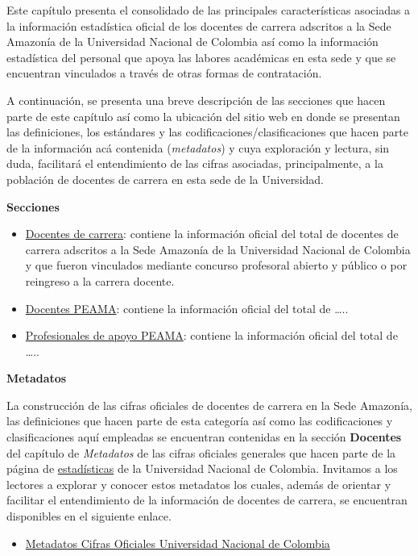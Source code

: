 \documentclass[
]{book}
\providecommand{\tightlist}{%
  \setlength{\itemsep}{0pt}\setlength{\parskip}{0pt}}
\begin{document}
Este capítulo presenta el consolidado de las principales características asociadas a la información estadística oficial de los docentes de carrera adscritos a la Sede Amazonía de la Universidad Nacional de Colombia así como la información estadística del personal que apoya las labores académicas en esta sede y que se encuentran vinculados a través de otras formas de contratación.

A continuación, se presenta una breve descripción de las secciones que hacen parte de este capítulo así como la ubicación del sitio web en donde se presentan las definiciones, los estándares y las codificaciones/clasificaciones que hacen parte de la información acá contenida (\emph{metadatos}) y cuya exploración y lectura, sin duda, facilitará el entendimiento de las cifras asociadas, principalmente, a la población de docentes de carrera en esta sede de la Universidad.

\textbf{Secciones}

\begin{itemize}
\item
  \protect\hyperlink{DocCar}{Docentes de carrera}: contiene la información oficial del total de docentes de carrera adscritos a la Sede Amazonía de la Universidad Nacional de Colombia y que fueron vinculados mediante concurso profesoral abierto y público o por reingreso a la carrera docente.
\item
  \protect\hyperlink{DocPEAMA}{Docentes PEAMA}: contiene la información oficial del total de \ldots..
\item
  \protect\hyperlink{DocApo}{Profesionales de apoyo PEAMA}: contiene la información oficial del total de \ldots..
\end{itemize}

\textbf{Metadatos}

La construcción de las cifras oficiales de docentes de carrera en la Sede Amazonía, las definiciones que hacen parte de esta categoría así como las codificaciones y clasificaciones aquí empleadas se encuentran contenidas en la sección \textbf{Docentes} del capítulo de \emph{Metadatos} de las cifras oficiales generales que hacen parte de la página de \href{http://estadisticas.unal.edu.co/home/}{estadísticas} de la Universidad Nacional de Colombia. Invitamos a los lectores a explorar y conocer estos metadatos los cuales, además de orientar y facilitar el entendimiento de la información de docentes de carrera, se encuentran disponibles en el siguiente enlace.

\begin{itemize}
\tightlist
\item
  \href{http://estadisticas.unal.edu.co/menu-principal/cifras-generales/metadatos/cifras-generales/}{Metadatos Cifras Oficiales Universidad Nacional de Colombia}
\end{itemize}
\end{document}
